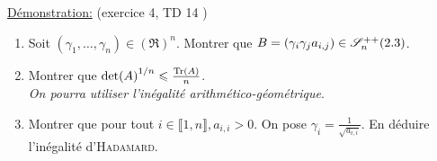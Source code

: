 \underline{Démonstration:} (exercice 4, TD 14 \cite{acamanes})

\begin{enumerate}
    \item Soit $(\gamma_1, \dots, \gamma_n) \in (\Re)^n$. Montrer que $B = (\gamma_i \gamma_j a_{i,j}) \in \mathscr{S}_n^{++}(2.3)$. 
    \item Montrer que $\det(A)^{1/n} \leqslant \frac{\mathrm{Tr}(A)}{n}$. \\
    \emph{On pourra utiliser l'inégalité arithmético-géométrique}.
    
    
    \item Montrer que pour tout $i \in \llbracket 1, n \rrbracket, a_{i,i} > 0$. On pose $\gamma_i = \frac{1}{\sqrt{a_{i,i}}}$. En déduire l'inégalité d'\textsc{Hadamard}.
\end{enumerate}